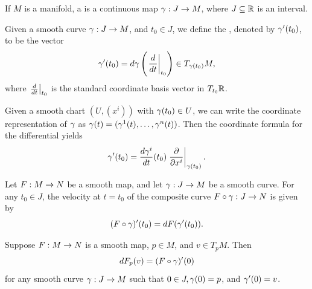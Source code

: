 \dfn If $M$ is a manifold, a  is a continuous map $\gamma:J\rightarrow M$, where $J\subseteq \mathbb{R}$ is an interval.

\dfn Given a smooth curve $\gamma:J\rightarrow M$, and $t_0\in J$, we define the , denoted by $\gamma^\prime(t_0)$, to be the vector
\[\gamma^\prime(t_0) = d\gamma\left(\left. \frac{d}{dt}\right|_{t_0}\right)\in T_{\gamma(t_0)}M,\]
where $\left. \frac{d}{dt}\right|_{t_0}$ is the standard coordinate basis vector in $T_{t_0}\mathbb{R}$.

\dfn Given a smooth chart $(U,(x^i))$ with $\gamma(t_0)\in U$, we can write the coordinate representation of $\gamma$ as $\gamma(t) = (\gamma^1(t),\ldots,\gamma^n(t))$. Then the coordinate formula for the differential yields
\[\gamma^\prime(t_0) = \frac{d\gamma^i}{dt}(t_0)\left. \frac{\partial}{\partial x^i}\right|_{\gamma(t_0)}.\]

\begin{prop}
\end{prop}

\begin{prop}
Let $F:M\rightarrow N$ be a smooth map, and let $\gamma:J\rightarrow M$ be a smooth curve. For any $t_0\in J$, the velocity at $t = t_0$ of the composite curve $F\circ \gamma:J\rightarrow N$ is given by
\[(F\circ \gamma)^\prime(t_0) = dF(\gamma^\prime(t_0)).\]
\end{prop}

\begin{cor}
Suppose $F:M\rightarrow N$ is a smooth map, $p\in M$, and $v\in T_pM$. Then
\[dF_p(v) = (F\circ \gamma)^\prime(0)\]
for any smooth curve $\gamma:J\rightarrow M$ such that $0\in J, \gamma(0) = p$, and $\gamma^\prime(0) = v$.
\end{cor}
